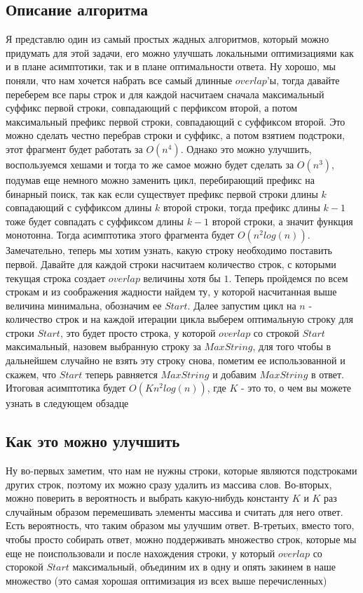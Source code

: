 \documentclass{article}
\begin{document}
\subsection{Описание алгоритма}
\newline
Я представлю один из самый простых жадных алгоритмов, который можно придумать для этой задачи, его можно улучшать локальными оптимизациями как и в плане асимптотики, так и в плане оптимальности ответа.\newline
Ну хорошо, мы поняли, что нам хочется набрать все самый длинные $overlap$'ы, тогда давайте переберем все пары строк и для каждой насчитаем сначала максимальный суффикс первой строки, совпадающий с перфиксом второй, а потом максимальный префикс первой строки, совпадающий с суффиксом второй. Это можно сделать честно перебрав строки и суффикс, а потом взятием подстроки, этот фрагмент будет работать за $O(n^4)$. Однако это можно улучшить, воспользуемся хешами и тогда то же самое можно будет сделать за $O(n^3)$, подумав еще немного можно заменить цикл, перебирающий префикс на бинарный поиск, так как если существует префикс первой строки длины $k$ совпадающий с суффиксом длины $k$ второй строки, тогда префикс длины $k-1$ тоже будет совпадать с суффиксом длины $k-1$ второй строки, а значит функция монотонна. Тогда асимптотика этого фрагмента будет $O(n^2log(n))$.\newline
Замечательно, теперь мы хотим узнать, какую строку необходимо поставить первой. Давайте для каждой строки насчитаем количество строк, с которыми текущая строка создает $overlap$ величины хотя бы $1$. Теперь пройдемся по всем строкам и из соображения жадности найдем ту, у которой насчитанная выше величина минимальна, обозначим ее $Start$. Далее запустим цикл на $n$ - количество строк и на каждой итерации цикла выберем оптимальную строку для строки $Start$, это будет просто строка, у которой $overlap$ со строкой $Start$ максимальный, назовем выбранную строку за $MaxString$, для того чтобы в дальнейшем случайно не взять эту строку снова, пометим ее
использованной и скажем, что $Start$ теперь равняется $MaxString$ и добавим $MaxString$ в ответ.\newline
Итоговая асимптотика будет $O(Kn^2log(n))$, где $K$ - это то, о чем вы можете узнать в следующем обзадце

\subsection{Как это можно улучшить}
Ну во-первых заметим, что нам не нужны строки, которые являются подстроками других строк, поэтому их можно сразу удалить из массива слов.\newline
Во-вторых, можно поверить в вероятность и выбрать какую-нибудь константу $K$ и $K$ раз случайным образом перемешивать элементы массива и считать для него ответ. Есть вероятность, что таким образом мы улучшим ответ.
В-третьих, вместо того, чтобы просто собирать ответ, можно поддерживать множество строк, которые мы еще не поиспользовали и после нахождения строки, у который $overlap$ со сторокой $Start$ максимальный, объединим их в одну и опять закинем в наше множество (это самая хорошая оптимизация из всех выше перечисленных)
\end{document}
